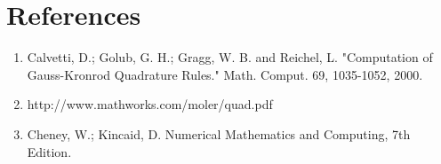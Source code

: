 \documentclass[11pt]{article} %
\begin{document}
\section{References}
\begin{enumerate}
\item Calvetti, D.; Golub, G. H.; Gragg, W. B. and Reichel, L. "Computation of Gauss-Kronrod Quadrature Rules." Math. Comput. 69, 1035-1052, 2000. 

\item http://www.mathworks.com/moler/quad.pdf

\item Cheney, W.; Kincaid, D. Numerical Mathematics and Computing, 7th Edition.
\end{enumerate}
\end{document}
